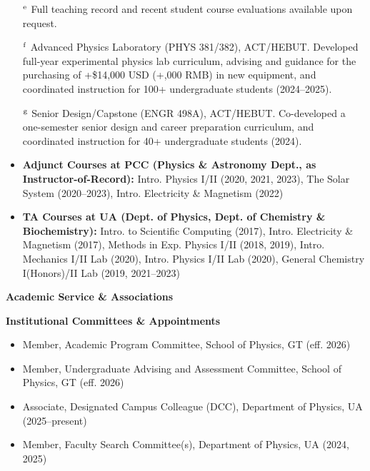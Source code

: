 \documentclass[11pt]{article}
\begin{document}
\begin{itemize}[leftmargin=*,nosep]
    \item[\(^{\rm e}\)] Full teaching record and recent student course evaluations available upon request.
    \item[\(^{\rm f}\)] Advanced Physics Laboratory (PHYS 381/382), ACT/HEBUT. Developed full-year experimental physics lab curriculum, advising and guidance for the purchasing of +\$14,000 USD (+,000 RMB) in new equipment, and coordinated instruction for 100+ undergraduate students (2024--2025).
    \item[\(^{\rm g}\)] Senior Design/Capstone (ENGR 498A), ACT/HEBUT. Co-developed a one-semester senior design and career preparation curriculum, and coordinated instruction for 40+ undergraduate students (2024).
\end{itemize}

\begin{itemize}[leftmargin=*,nosep]
    \item \textbf{Adjunct Courses at PCC (Physics \& Astronomy Dept., as Instructor-of-Record):} Intro. Physics I/II (2020, 2021, 2023), The Solar System (2020--2023), Intro. Electricity \& Magnetism (2022)
    \item \textbf{TA Courses at UA (Dept. of Physics, Dept. of Chemistry \& Biochemistry):} Intro. to Scientific Computing (2017), Intro. Electricity \& Magnetism (2017), Methods in Exp. Physics I/II (2018, 2019), Intro. Mechanics I/II Lab (2020), Intro. Physics I/II Lab (2020), General Chemistry I(Honors)/II Lab (2019, 2021--2023)
\end{itemize}

\medskip

{\Large\textbf{Academic Service \& Associations}}

{\large\textbf{Institutional Committees \& Appointments}}

\begin{itemize}[leftmargin=*,nosep]
    \item Member, Academic Program Committee, School of Physics, GT (eff. 2026)
    \item Member, Undergraduate Advising and Assessment Committee, School of Physics, GT (eff. 2026)
    \item Associate, Designated Campus Colleague (DCC), Department of Physics, UA (2025--present)
    \item Member, Faculty Search Committee(s), Department of Physics, UA (2024, 2025)
\end{itemize}
\end{document}
